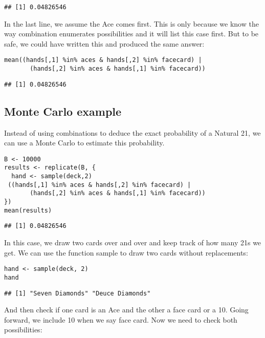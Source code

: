 \documentclass[
]{article}
\begin{document}
\begin{verbatim}
## [1] 0.04826546
\end{verbatim}

In the last line, we assume the Ace comes first. This is only because we
know the way combination enumerates possibilities and it will list this
case first. But to be safe, we could have written this and produced the
same answer:

\begin{verbatim}
mean((hands[,1] %in% aces & hands[,2] %in% facecard) |
       (hands[,2] %in% aces & hands[,1] %in% facecard))
\end{verbatim}

\begin{verbatim}
## [1] 0.04826546
\end{verbatim}

\hypertarget{monte-carlo-example}{%
\subsection{Monte Carlo example}\label{monte-carlo-example}}

Instead of using combinations to deduce the exact probability of a
Natural 21, we can use a Monte Carlo to estimate this probability.

\begin{verbatim}
B <- 10000
results <- replicate(B, {
  hand <- sample(deck,2)
 ((hands[,1] %in% aces & hands[,2] %in% facecard) |
       (hands[,2] %in% aces & hands[,1] %in% facecard))
})
mean(results)
\end{verbatim}

\begin{verbatim}
## [1] 0.04826546
\end{verbatim}

In this case, we draw two cards over and over and keep track of how many
21s we get. We can use the function sample to draw two cards without
replacements:

\begin{verbatim}
hand <- sample(deck, 2)
hand
\end{verbatim}

\begin{verbatim}
## [1] "Seven Diamonds" "Deuce Diamonds"
\end{verbatim}

And then check if one card is an Ace and the other a face card or a 10.
Going forward, we include 10 when we say face card. Now we need to check
both possibilities:
\end{document}
